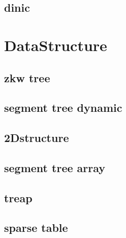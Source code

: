 \subsection{dinic}


\section{DataStructure}
\subsection{zkw tree}

\subsection{segment tree dynamic}

\subsection{2Dstructure}

\subsection{segment tree array}

\subsection{treap}

\subsection{sparse table}


